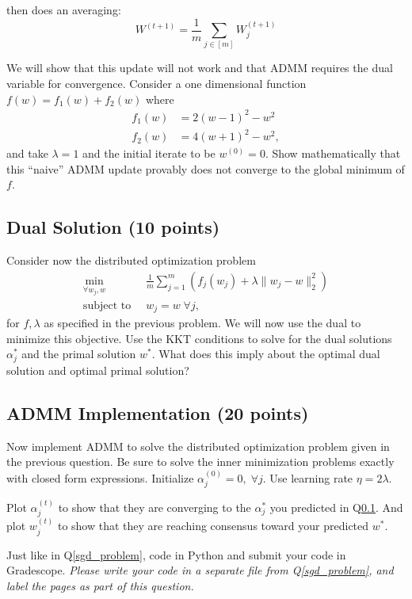 then does an averaging: 
$$W^{(t + 1)} = \frac{1}{m} \sum_{j \in [m]} W_j^{(t + 1)} $$

We will show that this update will not work and that ADMM requires the dual variable for convergence. Consider a one dimensional function $f(w) = f_1(w) + f_2(w)$ where \begin{align*}
    f_1(w) &= 2(w - 1)^2 - w^2\\
    f_2(w) &= 4(w + 1)^2 - w^2,
\end{align*} and take $\lambda = 1$ and the initial iterate to be $w^{(0)} = 0$.  Show mathematically that this ``naive'' ADMM update provably does not converge to the global minimum of $f$. 


\subsection{Dual Solution (10 points)}\label{dual_sol}
Consider now the distributed optimization problem \begin{align*}
    \min_{\forall w_j, w}\;\; &\frac{1}{m}\sum_{j=1}^m\left( f_j(w_j) + \lambda \|w_j - w\|_2^2\right)\\
    \text{subject to}\;\; & w_j = w \;\forall j,
\end{align*} for $f, \lambda$ as specified in the previous problem. We will now use the dual to minimize this objective. Use the KKT conditions to solve for the dual solutions $\alpha_j^*$ and the primal solution $w^*$. What does this imply about the optimal dual solution and optimal primal solution?


\subsection{ADMM Implementation (20 points)}

Now implement ADMM to solve the distributed optimization problem given in the previous question. Be sure to solve the inner minimization problems exactly with closed form expressions. Initialize $\alpha_j^{(0)} = 0, \; \forall j$. Use learning rate $\eta = 2\lambda$. 

Plot $\alpha_j^{(t)}$ to show that they are converging to the $\alpha_j^*$ you predicted in Q\ref{dual_sol}. And plot $w_j^{(t)}$ to show that they are reaching consensus toward your predicted $w^*$.

Just like in Q\ref{sgd_problem}, code in Python and submit your code in Gradescope. \textit{Please write your code in a separate file from Q\ref{sgd_problem}, and label the pages as part of this question.}

